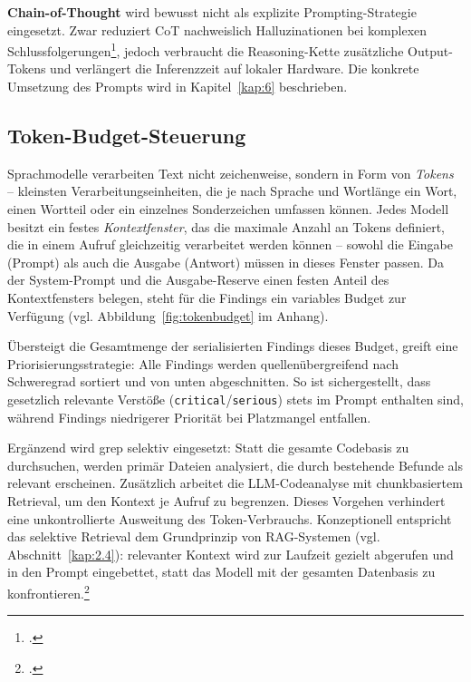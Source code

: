 \textbf{Chain-of-Thought} wird bewusst nicht als explizite Prompting-Strategie eingesetzt. Zwar reduziert CoT nachweislich Halluzinationen bei komplexen Schlussfolgerungen\footcite[Vgl.][S.~2]{wei2022chainofthought}, jedoch verbraucht die Reasoning-Kette zusätzliche Output-Tokens und verlängert die Inferenzzeit auf lokaler Hardware. Die konkrete Umsetzung des Prompts wird in Kapitel~\ref{kap:6} beschrieben.

\subsection{Token-Budget-Steuerung}

Sprachmodelle verarbeiten Text nicht zeichenweise, sondern in Form von \textit{Tokens} -- kleinsten Verarbeitungseinheiten, die je nach Sprache und Wortlänge ein Wort, einen Wortteil oder ein einzelnes Sonderzeichen umfassen können. Jedes Modell besitzt ein festes \textit{Kontextfenster}, das die maximale Anzahl an Tokens definiert, die in einem Aufruf gleichzeitig verarbeitet werden können -- sowohl die Eingabe (Prompt) als auch die Ausgabe (Antwort) müssen in dieses Fenster passen. Da der System-Prompt und die Ausgabe-Reserve einen festen Anteil des Kontextfensters belegen, steht für die Findings ein variables Budget zur Verfügung (vgl. Abbildung~\ref{fig:tokenbudget} im Anhang).

Übersteigt die Gesamtmenge der serialisierten Findings dieses Budget, greift eine Priorisierungsstrategie: Alle Findings werden quellenübergreifend nach Schweregrad sortiert und von unten abgeschnitten. So ist sichergestellt, dass gesetzlich relevante Verstöße (\texttt{critical}/\texttt{serious}) stets im Prompt enthalten sind, während Findings niedrigerer Priorität bei Platzmangel entfallen.

Ergänzend wird grep selektiv eingesetzt: Statt die gesamte Codebasis zu durchsuchen, werden primär Dateien analysiert, die durch bestehende Befunde als relevant erscheinen. Zusätzlich arbeitet die LLM-Codeanalyse mit chunkbasiertem Retrieval, um den Kontext je Aufruf zu begrenzen. Dieses Vorgehen verhindert eine unkontrollierte Ausweitung des Token-Verbrauchs. Konzeptionell entspricht das selektive Retrieval dem Grundprinzip von \ac{RAG}-Systemen (vgl. Abschnitt~\ref{kap:2.4}): relevanter Kontext wird zur Laufzeit gezielt abgerufen und in den Prompt eingebettet, statt das Modell mit der gesamten Datenbasis zu konfrontieren.\footcite[Vgl.][S.~1--2]{lewisRetrievalAugmentedGenerationKnowledgeIntensive2021}

